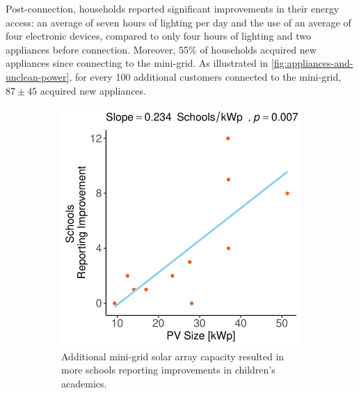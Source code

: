 Post-connection, households reported significant improvements in their energy access: an average of seven hours of lighting per day and the use of an average of four electronic devices, compared to only four hours of lighting and two appliances before connection. Moreover, 55\% of households acquired new appliances since connecting to the mini-grid. As illustrated in \cref{fig:appliances-and-unclean-power}, for every 100 additional customers connected to the mini-grid, $87\pm45$ acquired new appliances.

\begin{figure}[th]
	\centering
	\begin{subfigure}[t]{0.48\textwidth}
		\centering
		\includegraphics[width=\textwidth]{images/school_performance_regression_community.pdf}
		\caption{Additional mini-grid solar array capacity resulted in more schools reporting improvements in children's academics.}
		\label{fig:academics_schools}
	\end{subfigure}
	\hfill
	\begin{subfigure}[t]{0.48\textwidth}
		\centering

\end{subfigure}
\end{figure}
